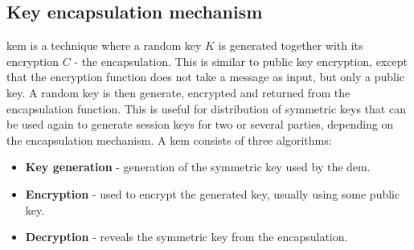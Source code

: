 \subsection{Key encapsulation mechanism}
\Gls{kem} \cite{kem_kurosawaP14} is a technique where a random key $K$ is generated together with its encryption $C$ - the encapsulation. This is similar to public key encryption, except that the encryption function does not take a message as input, but only a public key. A random key is then generate, encrypted and returned from the encapsulation function. This is useful for distribution of symmetric keys that can be used again to generate session keys for two or several parties, depending on the encapsulation mechanism. A \gls{kem} consists of three algorithms:
\begin{itemize}
\item \textbf{ Key generation } - generation of the symmetric key used by the \gls{dem}.
\item \textbf{ Encryption } - used to encrypt the generated key, usually using some public key.
\item \textbf{ Decryption } - reveals the symmetric key from the encapsulation.
\end{itemize}


